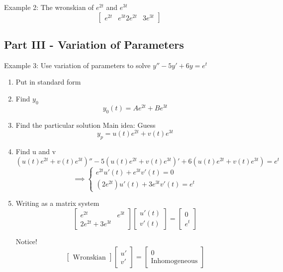 \documentclass[12pt]{article}
\begin{document}
Example 2: The wronskian of $e^{2t}$ and $e^{3t}$
\[\begin{bmatrix}
    e^{2t} & e^{3t}
    2e^{2t} & 3e^{3t}
\end{bmatrix}\]

\subsection*{Part III - Variation of Parameters}
Example 3: Use variation of parameters to solve $y'' - 5y' + 6y = e^t$
\begin{enumerate}
    \item Put in standard form
    
    \item Find $y_0$
    \[y_0(t) = Ae^{2t} + Be^{3t}\]

    \item Find the particular solution 
    Main idea: Guess 
    \[y_p = u(t) e^{2t} + v(t) e^{3t}\]

    \item Find u and v 
    \[(u(t) e^{2t} + v(t) e^{3t})'' - 5(u(t) e^{2t} + v(t) e^{3t})' + 6(u(t) e^{2t} + v(t) e^{3t}) = e^t\]
    \[\implies \begin{cases}
        e^{2t} u'(t) + e^{3t} v'(t) = 0\\
        (2e^{2t}) u'(t) + 3e^{3t} v'(t) = e^t
    \end{cases}\]

    \item Writing as a matrix system 
    \[\begin{bmatrix}
        e^{2t} & e^{3t}\\
        2e^{2t} + 3e^{3t}
    \end{bmatrix} \begin{bmatrix}
        u'(t)\\
        v'(t)
    \end{bmatrix} = \begin{bmatrix}
        0\\
        e^t
    \end{bmatrix}\]

    Notice! 
    \[\begin{bmatrix}
        \text{Wronskian}
    \end{bmatrix} \begin{bmatrix}
        u'\\
        v'
    \end{bmatrix} = \begin{bmatrix}
        0 \\
        \text{Inhomogeneous}
    \end{bmatrix}\]


\end{enumerate}
\end{document}
